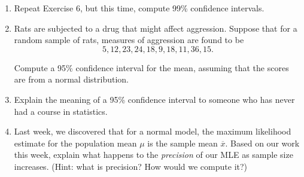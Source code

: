 \documentclass[10pt]{article}
\begin{document}
\begin{enumerate}
  \item Repeat Exercise 6, but this time, compute 99\% confidence intervals.
    
  \item Rats are subjected to a drug that might affect aggression.  Suppose that for a random sample of rats, measures of aggression are found to be
    \[
      5, 12, 23, 24, 18, 9, 18, 11, 36, 15.
    \]

    \noindent
    Compute a 95\% confidence interval for the mean, assuming that the scores are from a normal distribution.

  \item Explain the meaning of a 95\% confidence interval to someone who has never had a course in statistics.

    \item Last week, we discovered that for a normal model, the maximum likelihood estimate for the population mean $\mu$ is the sample mean $\overline{x}$.  Based on our work this week, explain what happens to the {\it precision} of our MLE as sample size increases. (Hint: what is precision? How would we compute it?)
    \end{enumerate}
\end{document}
